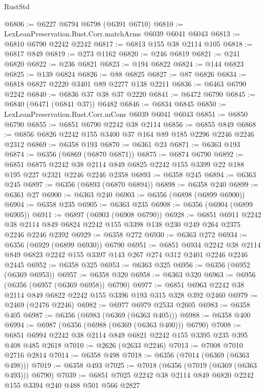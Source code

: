 \begin{lexlean}{RustStd}
\begin{coremodule}
@6806 := @6227 @6794 @6798 (@6391 @6710)
@6810 := LexLeanPreservation.Rust.Corr.matchArms @6039 @6041 @6043
@6813 := @6810 @6790 @2242 @2242
@6817 := @6813 @155 @38 @2114 @105
@6818 := @6817 @849
@6819 := @273 @1162
@6820 := @246 @6819
@6821 := @241 @6820
@6822 := @236 @6821
@6823 := @194 @6822
@6824 := @144 @6823
@6825 := @139 @6824
@6826 := @88 @6825
@6827 := @87 @6826
@6834 := @6818 @6827 @2220 @3401 @89 @2277 @138 @2211
@6836 := @6463 @6790 @2242
@6840 := @6836 @37 @38 @37 @2220
@6841 := @6472 @6790
@6845 := @6840 (@6471 (@6841 @37)) @6482
@6846 := @6834 @6845
@6850 := LexLeanPreservation.Rust.Corr.mCons @6039 @6041 @6043
@6851 := @6850 @6790
@6855 := @6851 @6790 @2242 @38 @2114
@6856 := @6855 @849
@6868 := @6856 @6826 @2242 @155 @3400 @37 @164 @89 @185 @2296 @2246 @2246 @2312
@6869 := @6358 @193
@6870 := @6361 @23
@6871 := @6363 @193
@6874 := @6356 (@6869 (@6870 @6871))
@6875 := @6874 @6790
@6892 := @6851
    @6875
    @2242
    @38
    @2114
    @849
    @6825
    @2242
    @155
    @3399
    @22
    @188
    @195
    @227
    @2321
    @2246
    @2246
    @2358
@6893 := @6358 @245
@6894 := @6363 @245
@6897 := @6356 (@6893 (@6870 @6894))
@6898 := @6358 @240
@6899 := @6361 @27
@6900 := @6363 @240
@6903 := @6356 (@6898 (@6899 @6900))
@6904 := @6358 @235
@6905 := @6363 @235
@6908 := @6356 (@6904 (@6899 @6905))
@6911 := @6897 (@6903 (@6908 @6790))
@6928 := @6851
    @6911
    @2242
    @38
    @2114
    @849
    @6824
    @2242
    @155
    @3398
    @138
    @230
    @249
    @264
    @2375
    @2246
    @2246
    @2392
@6929 := @6358 @272
@6930 := @6363 @272
@6934 := @6356 (@6929 (@6899 @6930)) @6790
@6951 := @6851
    @6934
    @2242
    @38
    @2114
    @849
    @6823
    @2242
    @155
    @3397
    @143
    @267
    @274
    @312
    @2401
    @2246
    @2246
    @2445
@6952 := @6358 @325
@6953 := @6363 @325
@6956 := @6356 (@6952 (@6369 @6953))
@6957 := @6358 @320
@6958 := @6363 @320
@6963 := @6956 (@6356 (@6957 (@6369 @6958)) @6790)
@6977 := @6851 @6963 @2242 @38 @2114 @849 @6822 @2242 @155 @3396 @193 @315 @328 @392 @2460
@6979 := @2469 (@2476 @2246)
@6982 := @6977 @6979 @2533 @2605
@6983 := @6358 @405
@6987 := @6356 (@6983 (@6369 (@6363 @405)))
@6988 := @6358 @400
@6994 := @6987 (@6356 (@6988 (@6369 (@6363 @400))) @6790)
@7008 := @6851 @6994 @2242 @38 @2114 @849 @6821 @2242 @155 @3395 @235 @395 @408 @485 @2618
@7010 := @2626 (@2633 @2246)
@7013 := @7008 @7010 @2716 @2814
@7014 := @6358 @498
@7018 := @6356 (@7014 (@6369 (@6363 @498)))
@7019 := @6358 @493
@7025 := @7018 (@6356 (@7019 (@6369 (@6363 @493))) @6790)
@7039 := @6851 @7025 @2242 @38 @2114 @849 @6820 @2242 @155 @3394 @240 @488 @501 @566 @2827

\end{coremodule}
\end{lexlean}
